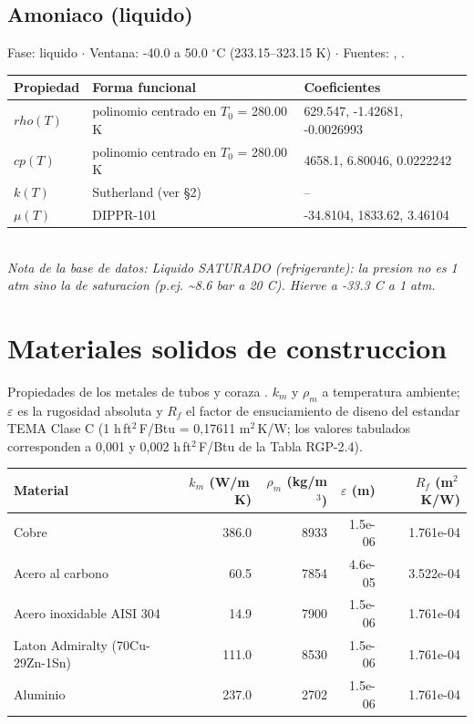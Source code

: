 \documentclass[11pt,a4paper]{article}
\begin{document}
\subsection*{Amoniaco (liquido)}
{\small\color{gristexto} Fase: liquido $\cdot$ Ventana:
 -40.0 a 50.0 $^\circ$C (233.15--323.15 K)
 $\cdot$ Fuentes: \cite{ashrae}, \cite{perry}.}\\[2pt]
\begin{tabular}{llp{7.6cm}}
\toprule
\textbf{Propiedad} & \textbf{Forma funcional} & \textbf{Coeficientes} \\
\midrule
$rho(T)$ & polinomio centrado en $T_0$ = 280.00 K & 629.547, -1.42681, -0.0026993 \\
$cp(T)$ & polinomio centrado en $T_0$ = 280.00 K & 4658.1, 6.80046, 0.0222242 \\
$k(T)$ & Sutherland (ver \S2) & -- \\
$\mu(T)$ & DIPPR-101 & -34.8104, 1833.62, 3.46104 \\
\bottomrule
\end{tabular}\\[3pt]
{\footnotesize\itshape Nota de la base de datos: Liquido SATURADO (refrigerante): la presion no es 1 atm sino la de saturacion (p.ej. \textasciitilde{}8.6 bar a 20 C). Hierve a -33.3 C a 1 atm.}
\vspace{0.7em}

\section{Materiales solidos de construccion}
Propiedades de los metales de tubos y coraza \cite{tema}. $k_m$ y $\rho_m$ a
temperatura ambiente; $\varepsilon$ es la rugosidad absoluta y $R_f$ el
factor de ensuciamiento de diseno del estandar TEMA Clase C (1
h\,ft$^2$\,\textdegree F/Btu = 0{,}17611 m$^2$\,K/W; los valores tabulados
corresponden a 0,001 y 0,002 h\,ft$^2$\,\textdegree F/Btu de la Tabla
RGP-2.4).

\begin{tabular}{lrrrr}
\toprule
\textbf{Material} & \textbf{$k_m$ (W/m\,K)} & \textbf{$\rho_m$
 (kg/m$^3$)} & \textbf{$\varepsilon$ (m)} & \textbf{$R_f$
 (m$^2$\,K/W)} \\
\midrule
Cobre & 386.0 & 8933 & 1.5e-06 & 1.761e-04 \\
Acero al carbono & 60.5 & 7854 & 4.6e-05 & 3.522e-04 \\
Acero inoxidable AISI 304 & 14.9 & 7900 & 1.5e-06 & 1.761e-04 \\
Laton Admiralty (70Cu-29Zn-1Sn) & 111.0 & 8530 & 1.5e-06 & 1.761e-04 \\
Aluminio & 237.0 & 2702 & 1.5e-06 & 1.761e-04 \\
\bottomrule
\end{tabular}
\end{document}
